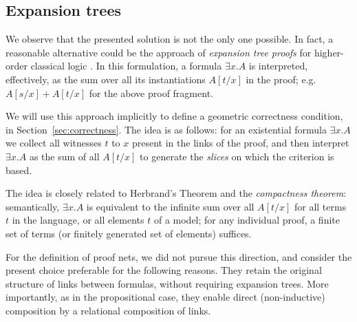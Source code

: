 \documentclass[UKenglish]{lipics-v2016}
\theoremstyle{plain}
\newcommand\+{+}
\renewcommand\*{\times}
\newcommand\dual[1]{\overline{#1}}
\newcommand\seq[2]{{\vdash}#1,#2}
\begin{document}
\subsection{Expansion trees}

We observe that the presented solution is not the only one possible. In fact, a reasonable alternative could be the approach of \emph{expansion tree proofs} for higher-order classical logic \cite{Miller}. In this formulation, a formula $\exists x.A$ is interpreted, effectively, as the sum over all its instantiations $A[t/x]$ in the proof; e.g.\ $A[s/x]\+A[t/x]$ for the above proof fragment.

We will use this approach implicitly to define a geometric correctness condition, in Section~\ref{sec:correctness}. The idea is as follows: for an existential formula $\exists x.A$ we collect all witnesses $t$ to $x$ present in the links of the proof, and then interpret $\exists x.A$ as the sum of all $A[t/x]$ to generate the \emph{slices} on which the criterion is based.

The idea is closely related to Herbrand's Theorem \cite{Herbrand} and the \emph{compactness theorem}: semantically, $\exists x.A$ is equivalent to the infinite sum over all $A[t/x]$ for all terms $t$ in the language, or all elements $t$ of a model; for any individual proof, a finite set of terms (or finitely generated set of elements) suffices.

For the definition of proof nets, we did not pursue this direction, and consider the present choice preferable for the following reasons. They retain the original structure of links between formulas, without requiring expansion trees. More importantly, as in the propositional case, they enable direct (non-inductive) composition by a relational composition of links.






%
%
%
\end{document}

